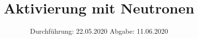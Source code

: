 

\subject{702}
\title{Aktivierung mit Neutronen}
\date{%
  Durchführung: 22.05.2020
  \hspace{3em}
  Abgabe: 11.06.2020
}



\maketitle
\thispagestyle{empty}
\tableofcontents
\newpage






\nocite{702}
\printbibliography{}


